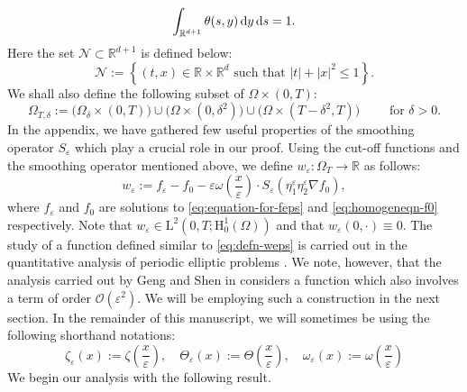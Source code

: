 \documentclass[preprint, 12pt]{amsart}
\numberwithin{equation}{section}
\numberwithin{equation}{section}
\newcommand\RR{\mathbb{R}}
\newcommand{\eps}{\varepsilon}
\begin{document}
\[
\int_{\RR^{d+1}}\theta(s,y) \, {\rm d}y\, {\rm d}s = 1.
\]
Here the set $\mathcal{N}\subset\RR^{d+1}$ is defined below:
\[
\mathcal{N} := \left\{ (t,x)\in\RR\times\RR^{d} \mbox{ such that }\left\vert t\right\vert + \left\vert x\right\vert^2 \le 1 \right\}.
\]
We shall also define the following subset of $\Omega\times(0,T)$:
\[
\Omega_{T,\delta} := \Big( \Omega_\delta \times (0,T) \Big) \cup \Big( \Omega \times (0,\delta^2) \Big) \cup \Big( \Omega \times (T-\delta^2, T) \Big) \qquad \mbox{ for }\delta>0.
\]
In the appendix, we have gathered few useful properties of the smoothing operator $S_\eps$ which play a crucial role in our proof. Using the cut-off functions and the smoothing operator mentioned above, we define $w_\eps:\Omega_T\to\RR$ as follows:
\begin{equation}\label{eq:defn-weps}
w_\eps := f_\eps - f_0 - \eps \omega\left(\frac{x}{\eps}\right)\cdot S_\eps \left( \eta_1^\eps \eta_2^\eps \nabla f_0 \right),
\end{equation}
where $f_\eps$ and $f_0$ are solutions to \eqref{eq:equation-for-feps} and \eqref{eq:homogeneqn-f0} respectively. Note that $w_\eps\in\mathrm L^2(0,T;\mathrm H^1_0(\Omega))$ and that $w_\eps(0,\cdot)\equiv0$. The study of a function defined similar to \eqref{eq:defn-weps} is carried out in the quantitative analysis of periodic elliptic problems \cite[Chapter 3, page 33]{shen2018periodic}. We note, however, that the analysis carried out by Geng and Shen in \cite[equation (1.14), page 2095]{geng2017convergence} considers a function which also involves a term of order $\mathcal{O}(\eps^2)$. We will be employing such a construction in the next section. In the remainder of this manuscript, we will sometimes be using the following shorthand notations:
\[
\zeta_\eps(x) := \zeta\left(\frac{x}{\eps}\right),
\quad
\Theta_\eps(x) := \Theta\left(\frac{x}{\eps}\right),
\quad
\omega_\eps(x) := \omega\left(\frac{x}{\eps}\right)
\]
We begin our analysis with the following result. 
\end{document}

